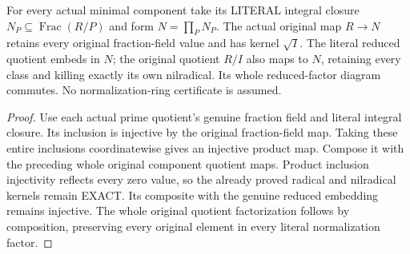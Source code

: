 \begin{definition}
\label{algebra:actual-component-normalization-product}
\leanok
{}
For every actual minimal component take its LITERAL integral closure
$N_P\subseteq\operatorname{Frac}(R/P)$ and form $N=\prod_P N_P$.
The actual original map $R\to N$ retains every original fraction-field
value and has kernel $\sqrt I$. The literal reduced quotient embeds
in $N$; the original quotient $R/I$ also maps to $N$, retaining every
class and killing exactly its own nilradical. Its whole reduced-factor
diagram commutes. No normalization-ring certificate is assumed.
\end{definition}
\begin{proof}
Use each actual prime quotient's genuine fraction field and literal
integral closure. Its inclusion is injective by the original fraction-field
map. Taking these entire inclusions coordinatewise gives an injective
product map. Compose it with the preceding whole original component
quotient maps. Product inclusion injectivity reflects every zero value,
so the already proved radical and nilradical kernels remain EXACT.
Its composite with the genuine reduced embedding remains injective.
The whole original quotient factorization follows by composition,
preserving every original element in every literal normalization factor.
\end{proof}

